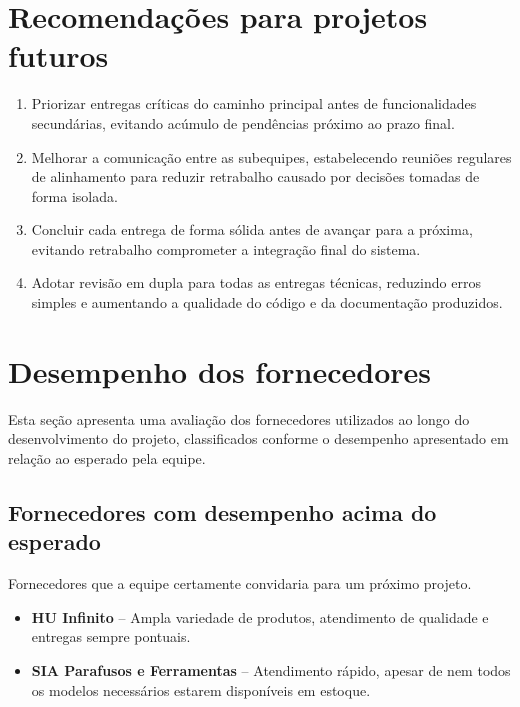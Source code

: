 \section{Recomendações para projetos futuros}

\begin{enumerate}
    \item Priorizar entregas críticas do caminho principal antes de 
    funcionalidades secundárias, evitando acúmulo de pendências próximo 
    ao prazo final.
    
    \item Melhorar a comunicação entre as subequipes, estabelecendo 
    reuniões regulares de alinhamento para reduzir retrabalho causado 
    por decisões tomadas de forma isolada.
    
    \item Concluir cada entrega de forma sólida antes de avançar para 
    a próxima, evitando retrabalho comprometer a integração final do sistema.
    
    \item Adotar revisão em dupla para todas as entregas técnicas, 
    reduzindo erros simples e aumentando a qualidade do código e da 
    documentação produzidos.
\end{enumerate}

\section{Desempenho dos fornecedores}


Esta seção apresenta uma avaliação dos fornecedores utilizados ao longo do desenvolvimento do projeto, classificados conforme o desempenho apresentado em relação ao esperado pela equipe.

\subsection{Fornecedores com desempenho acima do esperado}

Fornecedores que a equipe certamente convidaria para um próximo projeto.

\begin{itemize}
    \item \textbf{HU Infinito} -- Ampla variedade de produtos, atendimento de qualidade e entregas sempre pontuais.
    \item \textbf{SIA Parafusos e Ferramentas} -- Atendimento rápido, apesar de nem todos os modelos necessários estarem disponíveis em estoque.
\end{itemize}

